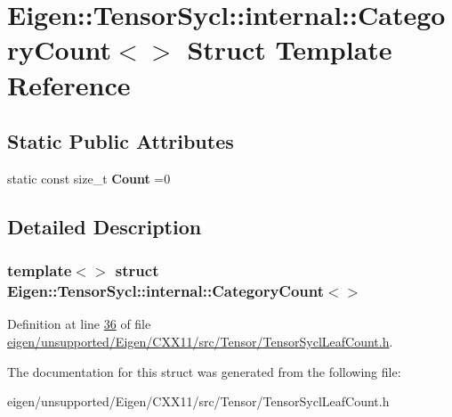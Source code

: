 \hypertarget{struct_eigen_1_1_tensor_sycl_1_1internal_1_1_category_count_3_4}{}\section{Eigen\+:\+:Tensor\+Sycl\+:\+:internal\+:\+:Category\+Count$<$$>$ Struct Template Reference}
\label{struct_eigen_1_1_tensor_sycl_1_1internal_1_1_category_count_3_4}
\subsection*{Static Public Attributes}
\begin{DoxyCompactItemize}
\item 
\mbox{\label{struct_eigen_1_1_tensor_sycl_1_1internal_1_1_category_count_3_4_a71777741bf6b5fed04ee680851b32a80}} 
static const size\+\_\+t {\bfseries Count} =0
\end{DoxyCompactItemize}


\subsection{Detailed Description}
\subsubsection*{template$<$$>$\newline
struct Eigen\+::\+Tensor\+Sycl\+::internal\+::\+Category\+Count$<$$>$}



Definition at line \hyperlink{eigen_2unsupported_2_eigen_2_c_x_x11_2src_2_tensor_2_tensor_sycl_leaf_count_8h_source_l00036}{36} of file \hyperlink{eigen_2unsupported_2_eigen_2_c_x_x11_2src_2_tensor_2_tensor_sycl_leaf_count_8h_source}{eigen/unsupported/\+Eigen/\+C\+X\+X11/src/\+Tensor/\+Tensor\+Sycl\+Leaf\+Count.\+h}.



The documentation for this struct was generated from the following file\+:\begin{DoxyCompactItemize}
\item 
eigen/unsupported/\+Eigen/\+C\+X\+X11/src/\+Tensor/\+Tensor\+Sycl\+Leaf\+Count.\+h\end{DoxyCompactItemize}
